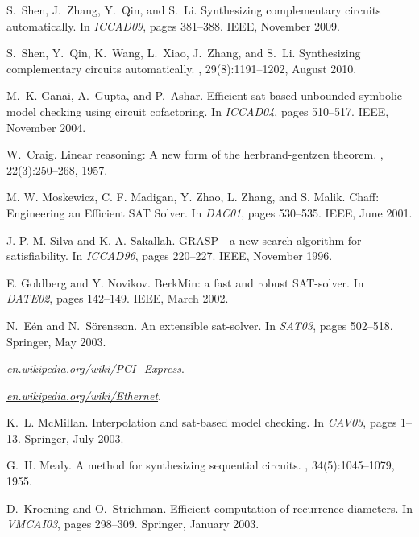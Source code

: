 \documentclass{acm_proc_article-sp}
\begin{document}
\begin{thebibliography}{10}

S.~Shen, J.~Zhang, Y.~Qin, and S.~Li.
\newblock Synthesizing complementary circuits automatically.
\newblock In {\em ICCAD09}, pages 381--388. IEEE,
  November 2009.

S.~Shen, Y.~Qin, K.~Wang, L.~Xiao, J.~Zhang, and S.~Li.
\newblock Synthesizing complementary circuits automatically.
,
  29(8):1191--1202, August 2010.

M.~K. Ganai, A.~Gupta, and P.~Ashar.
\newblock Efficient sat-based unbounded symbolic model checking using circuit
  cofactoring.
\newblock In {\em ICCAD04}, pages 510--517. IEEE,
  November 2004.

W.~Craig.
\newblock Linear reasoning: A new form of the herbrand-gentzen theorem.
, 22(3):250--268, 1957.

M. W. Moskewicz, C. F. Madigan, Y. Zhao, L. Zhang, and S. Malik.
\newblock Chaff: Engineering an Efficient SAT Solver.
\newblock In {\em DAC01}, pages 530--535. IEEE, June
  2001.

J. P. M. Silva and K. A. Sakallah.
\newblock GRASP - a new search algorithm for satisfiability.
\newblock In {\em ICCAD96}, pages 220--227. IEEE, November
  1996.

E. Goldberg and Y. Novikov.
\newblock BerkMin: a fast and robust SAT-solver.
\newblock In {\em DATE02}, pages 142--149. IEEE, March
  2002.

N.~E\'en and N.~S\"orensson.
\newblock An extensible sat-solver.
\newblock In {\em SAT03}, pages 502--518. Springer, May
  2003.

\emph{\url{en.wikipedia.org/wiki/PCI_Express}}.

\emph{\url{en.wikipedia.org/wiki/Ethernet}}.

K.~L. McMillan.
\newblock Interpolation and sat-based model checking.
\newblock In {\em CAV03}, pages 1--13. Springer, July
  2003.

G.~H. Mealy.
\newblock A method for synthesizing sequential circuits.
, 34(5):1045--1079, 1955.

D.~Kroening and O.~Strichman.
\newblock Efficient computation of recurrence diameters.
\newblock In {\em VMCAI03}, pages 298--309. Springer,
  January 2003.


\end{thebibliography}
\end{document}

